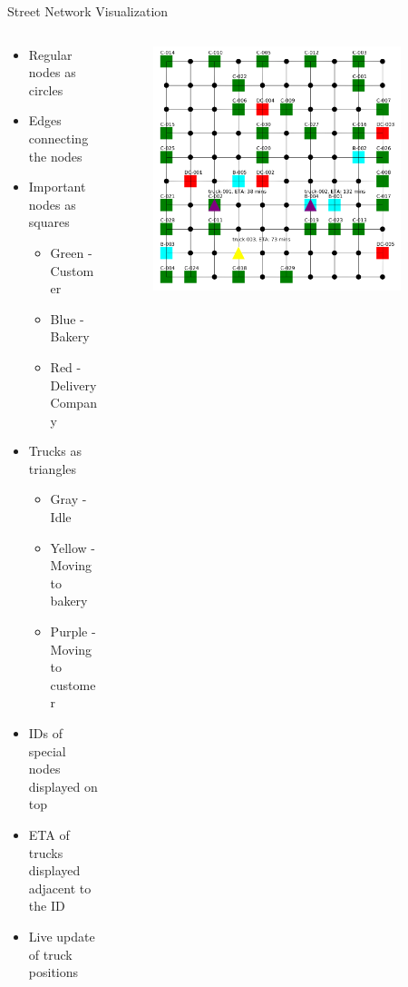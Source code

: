 \documentclass[9pt]{beamer}
\let\olditem=\item%
\renewcommand{\item}{\olditem \justifying}%
\begin{document}
\begin{frame}{Street Network Visualization}
\begin{minipage}[0.3\textheight]{\textwidth}
    \begin{columns}[T]
        \begin{column}{0.53\textwidth}
        \begin{itemize}
        	\item Regular nodes as circles
        	\item Edges connecting the nodes
			\item Important nodes as squares
			\begin{itemize}
				\item Green - Customer
				\item Blue - Bakery
				\item Red - Delivery Company
			\end{itemize}
			\item Trucks as triangles
			\begin{itemize}
				\item Gray - Idle
				\item Yellow - Moving to bakery
				\item Purple - Moving to customer
			\end{itemize}
			\item IDs of special nodes displayed on top
			\item ETA of trucks displayed adjacent to the ID
			\item Live update of truck positions
		\end{itemize}
    \end{column}
    \begin{column}{0.7\textwidth}
    \begin{figure}[h!]
	\centering
	\includegraphics[width=0.9\textwidth]{Visualization.png}
\end{figure}
        \end{column}
    \end{columns}
\end{minipage}
\end{frame}
\end{document}
